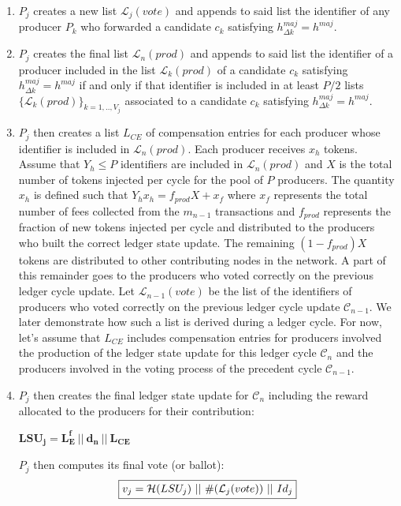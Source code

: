 \begin{enumerate}
\item $P_j$ creates a new list $\mathcal{L}_j(vote)$ and appends to said list the identifier of any producer $P_k$ who forwarded a candidate $c_k$ satisfying $h^{maj}_{\Delta k} = h^{maj}$.
\item $P_j$ creates the final list $\mathcal{L}_n(prod)$ and appends to said list the identifier of a producer included in the list $\mathcal{L}_k(prod)$ of a candidate $c_k$ satisfying $h^{maj}_{\Delta k} = h^{maj}$ if and only if that identifier is included in at least $P/2$ lists $\{\mathcal{L}_{k}(prod)\}_{k=1,..,V_j}$ associated to a candidate $c_{k}$ satisfying $h^{maj}_{\Delta k} = h^{maj}$. 
\item $P_j$ then creates a list $L_{CE}$ of compensation entries for each producer whose identifier is included in $\mathcal{L}_n(prod)$. Each producer receives $x_h$ tokens. Assume that $Y_h \leq P$ identifiers are included in $\mathcal{L}_n(prod)$ and $X$ is the total number of tokens injected per cycle for the pool of $P$ producers. The quantity $x_h$ is defined such that $Y_hx_h = f_{prod}X + x_f$ where $x_f$ represents the total number of fees collected from the $m_{n-1}$ transactions and $f_{prod}$ represents the fraction of new tokens injected per cycle and distributed to the producers who built the correct ledger state update. The remaining $(1-f_{prod})X$ tokens are distributed to other contributing nodes in the network. A part of this remainder goes to the producers who voted correctly on the previous ledger cycle update. Let $\mathcal{L}_{n-1}(vote)$ be the list of the identifiers of producers who voted correctly on the previous ledger cycle update $\mathcal{C}_{n-1}$. We later demonstrate how such a list is derived during a ledger cycle. For now, let's assume that $L_{CE}$ includes compensation entries for producers involved the production of the ledger state update for this ledger cycle $\mathcal{C}_n$ and the producers involved in the voting process of the precedent cycle $\mathcal{C}_{n-1}$. 
\item $P_j$ then creates the final ledger state update for $\mathcal{C}_n$ including the reward allocated to the producers for their contribution:
\begin{center}
$\mathbf{LSU_j = L^f_E~||~d_n~||~L_{CE}}$
\end{center}
$P_j$ then computes its final vote (or ballot):
\begin{equation}
\label{eq:vj}
\fbox{$v_j = \mathcal{H}(LSU_j)~||~\#(\mathcal{L}_j(vote))~||~Id_j$}
\end{equation}


\end{enumerate}
